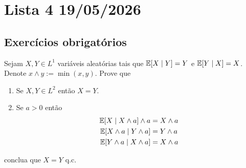\section{Lista 4 19/05/2026}

\subsection{Exercícios obrigatórios}

\begin{exercise} [1]
	Sejam $X,Y \in L^1$ variáveis aleatórias tais que $\mathbb{E} [X \mid Y] =
	Y$ e $\mathbb{E} [Y \mid X] = X$. Denote
	$x \land y := \min(x,y)$. Prove que
	\begin{enumerate}[label=(\alph*)]
		\item Se $X,Y \in L^2$ então $X = Y$.
		\item Se $a > 0$ então
			\begin{align*}
				\mathbb{E} [X \mid X \land a] \land a &= X \land a\\
				\mathbb{E} [X \land a \mid Y \land a] &= Y \land a\\
				\mathbb{E} [Y \land a \mid X \land a] &= X \land a\\
			\end{align*}
	\end{enumerate}
	conclua que $X = Y$ q.c.
\end{exercise}

